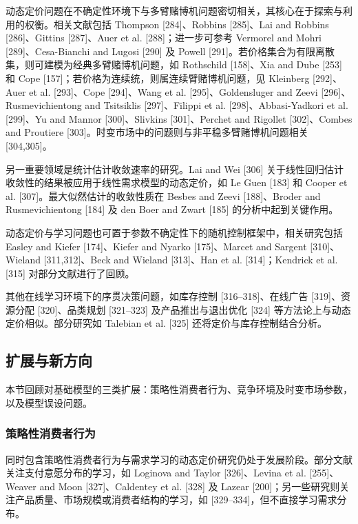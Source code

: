 动态定价问题在不确定性环境下与多臂赌博机问题密切相关，其核心在于探索与利用的权衡。相关文献包括 Thompson [284]、Robbins [285]、Lai and Robbins [286]、Gittins [287]、Auer et al. [288]；进一步可参考 Vermorel and Mohri [289]、Cesa-Bianchi and Lugosi [290] 及 Powell [291]。若价格集合为有限离散集，则可建模为经典多臂赌博机问题，如 Rothschild [158]、Xia and Dube [253] 和 Cope [157]；若价格为连续统，则属连续臂赌博机问题，见 Kleinberg [292]、Auer et al. [293]、Cope [294]、Wang et al. [295]、Goldensluger and Zeevi [296]、Rusmevichientong and Tsitsiklis [297]、Filippi et al. [298]、Abbasi-Yadkori et al. [299]、Yu and Mannor [300]、Slivkins [301]、Perchet and Rigollet [302]、Combes and Proutiere [303]。时变市场中的问题则与非平稳多臂赌博机问题相关 [304,305]。

另一重要领域是统计估计收敛速率的研究。Lai and Wei [306] 关于线性回归估计收敛性的结果被应用于线性需求模型的动态定价，如 Le Guen [183] 和 Cooper et al. [307]。最大似然估计的收敛性质在 Besbes and Zeevi [188]、Broder and Rusmevichientong [184] 及 den Boer and Zwart [185] 的分析中起到关键作用。

动态定价与学习问题也可置于参数不确定性下的随机控制框架中，相关研究包括 Easley and Kiefer [174]、Kiefer and Nyarko [175]、Marcet and Sargent [310]、Wieland [311,312]、Beck and Wieland [313]、Han et al. [314]；Kendrick et al. [315] 对部分文献进行了回顾。

其他在线学习环境下的序贯决策问题，如库存控制 [316–318]、在线广告 [319]、资源分配 [320]、品类规划 [321–323] 及产品推出与退出优化 [324] 等方法论上与动态定价相似。部分研究如 Talebian et al. [325] 还将定价与库存控制结合分析。

\subsection{扩展与新方向}\label{extensions-and-new-directions}

本节回顾对基础模型的三类扩展：策略性消费者行为、竞争环境及时变市场参数，以及模型误设问题。

\subsubsection{策略性消费者行为}\label{strategic-consumer-behavior}

同时包含策略性消费者行为与需求学习的动态定价研究仍处于发展阶段。部分文献关注支付意愿分布的学习，如 Loginova and Taylor [326]、Levina et al. [255]、Weaver and Moon [327]、Caldentey et al. [328] 及 Lazear [200]；另一些研究则关注产品质量、市场规模或消费者结构的学习，如 [329–334]，但不直接学习需求分布。

